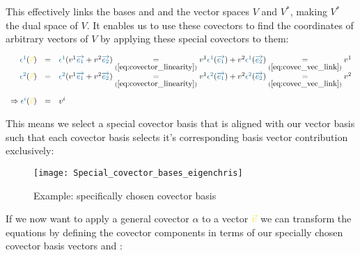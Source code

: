 This effectively links the bases  and  and the vector spaces $V$ and
$V^*$, making $V^*$ the dual space of $V$. It enables us to use these covectors to find
the coordinates of arbitrary vectors of $V$ by applying these special covectors to them:

\begin{equation}
    \begin{array}{rcl}
        \label{eq:covec_application}
        \hdcbvc{1}(\hdv) & = &
        \hdcbvc{1}(\hdvc{1}\hdbv{1} + \hdvc{2}\hdbv{2})
        \underset{(\ref{eq:covector_linearity})}{=}
        \hdvc{1}\hdcbvc{1}(\hdbv{1}) + \hdvc{2}\hdcbvc{1}(\hdbv{2})
        \underset{(\ref{eq:covec_vec_link})}{=}
        \hdvc{1} \\
        \hdcbvc{2}(\hdv) & = &
        \hdcbvc{2}(\hdvc{1}\hdbv{1} + \hdvc{2}\hdbv{2})
        \underset{(\ref{eq:covector_linearity})}{=}
        \hdvc{1}\hdcbvc{2}(\hdbv{1}) + \hdvc{2}\hdcbvc{2}(\hdbv{2})
        \underset{(\ref{eq:covec_vec_link})}{=}
        \hdvc{2} \\
        \noalign{\vskip10pt}
        \Rightarrow \hdcbvc{i}(\hdv) & = & \hdvc{i}
    \end{array}
\end{equation}

This means we select a special covector basis that is aligned with our vector basis such
that each covector basis selects it's corresponding basis vector contribution exclusively:
\\

\begin{figure}[h]
    \centering
    \texttt{[image: Special\_covector\_bases\_eigenchris]}
    \caption{Example: specifically chosen covector basis}
    \label{fig:selected_covector_basis}
\end{figure}

If we now want to apply a general covector $\alpha$ to a vector $\hdv$ we can transform
the equations by defining the covector components in terms of our specially chosen
covector basis vectors  and :

